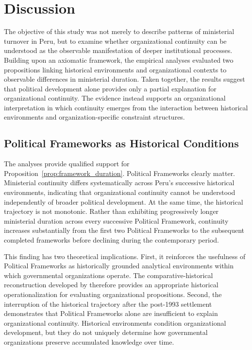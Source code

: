 \documentclass[doc, 12pt, a4paper,floatsintext]{apa7}
\begin{document}
\section{Discussion}

The objective of this study was not merely to describe patterns of ministerial turnover in Peru, but to examine whether organizational continuity can be understood as the observable manifestation of deeper institutional processes. Building upon an axiomatic framework, the empirical analyses evaluated two propositions linking historical environments and organizational contexts to observable differences in ministerial duration. Taken together, the results suggest that political development alone provides only a partial explanation for organizational continuity. The evidence instead supports an organizational interpretation in which continuity emerges from the interaction between historical environments and organization-specific constraint structures.

\subsection{Political Frameworks as Historical Conditions}

The analyses provide qualified support for Proposition~\ref{prop:framework_duration}. Political Frameworks clearly matter. Ministerial continuity differs systematically across Peru's successive historical environments, indicating that organizational continuity cannot be understood independently of broader political development. At the same time, the historical trajectory is not monotonic. Rather than exhibiting progressively longer ministerial duration across every successive Political Framework, continuity increases substantially from the first two Political Frameworks to the subsequent completed frameworks before declining during the contemporary period.

This finding has two theoretical implications. First, it reinforces the usefulness of Political Frameworks as historically grounded analytical environments within which governmental organizations operate. The comparative-historical reconstruction developed by \textcite{lopez_jimenez_peru_2025} therefore provides an appropriate historical operationalization for evaluating organizational propositions. Second, the interruption of the historical trajectory after the post-1993 settlement demonstrates that Political Frameworks alone are insufficient to explain organizational continuity. Historical environments condition organizational development, but they do not uniquely determine how governmental organizations preserve accumulated knowledge over time.
\end{document}
